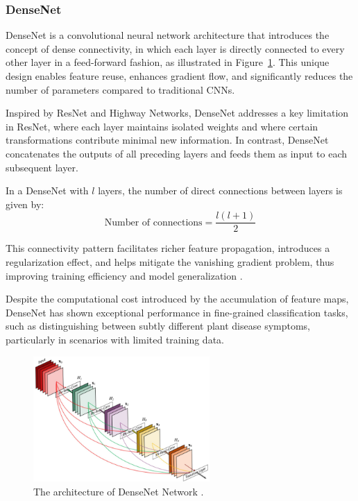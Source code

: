 \subsubsection{DenseNet}

DenseNet is a convolutional neural network architecture that introduces the concept of dense connectivity, in which each layer is directly connected to every other layer in a feed-forward fashion, as illustrated in Figure~\ref{fig:figure12}. This unique design enables feature reuse, enhances gradient flow, and significantly reduces the number of parameters compared to traditional CNNs.

Inspired by ResNet and Highway Networks, DenseNet addresses a key limitation in ResNet, where each layer maintains isolated weights and where certain transformations contribute minimal new information. In contrast, DenseNet concatenates the outputs of all preceding layers and feeds them as input to each subsequent layer.

In a DenseNet with $l$ layers, the number of direct connections between layers is given by:
\[
\text{Number of connections} = \frac{l(l+1)}{2} \tag{4}
\]

This connectivity pattern facilitates richer feature propagation, introduces a regularization effect, and helps mitigate the vanishing gradient problem, thus improving training efficiency and model generalization \parencite{alzubaidi2021review}.

Despite the computational cost introduced by the accumulation of feature maps, DenseNet has shown exceptional performance in fine-grained classification tasks, such as distinguishing between subtly different plant disease symptoms, particularly in scenarios with limited training data.

\begin{figure}[H] %
    \centering
    \includegraphics[width=0.6\textwidth]{chapters/chapter1/images/Figure12.png}
    \caption{The architecture of DenseNet Network \parencite{alzubaidi2021review}.}
    \label{fig:figure12}
\end{figure}


